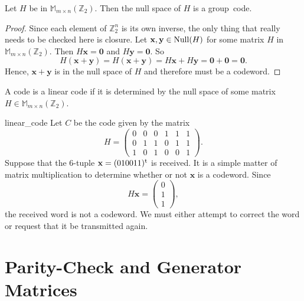  
\begin{theorem}
Let $H$ be in ${\mathbb M}_{m \times n}({\mathbb Z}_2)$. Then the null space of
$H$ is a group~code. 
\end{theorem}
 
 
\begin{proof}
Since each element of ${\mathbb Z}_2^n$ is its own inverse, the only
thing that really needs to be checked here is closure. Let ${\mathbf x},
{\mathbf y} \in {\rm Null}(H)$ for some matrix $H$ in ${\mathbb M}_{m \times
n}({\mathbb Z}_2)$. Then $H{\mathbf x} = {\mathbf 0}$ and $H{\mathbf y} =
{\mathbf 0}$. So 
\[
H({\mathbf x}+{\mathbf y}) = H({\mathbf x} +{\mathbf y})
=
H{\mathbf x} + H{\mathbf y} = {\mathbf 0}
+
{\mathbf 0}
= {\mathbf 0}.
\]
Hence, ${\mathbf x}+{\mathbf y}$ is in the null space of $H$ and
therefore must be a codeword. 
\hspace*{1in}
\end{proof}
 
 
\medskip
 
 
A code is a {\bfi linear code\/} if it is
determined by the null space of some matrix $H \in {\mathbb M}_{m \times
n}({\mathbb Z}_2)$.  
 
 
 
\begin{example}{linear_code}
Let $C$ be the code given by the matrix
\[
H =
\begin{pmatrix}
0 & 0 & 0 & 1 & 1 & 1 \\
0 & 1 & 1 & 0 & 1 & 1 \\
1 & 0 & 1 & 0 & 0 & 1
\end{pmatrix}.
\]
Suppose that the 6-tuple ${\mathbf x} = (010011)^{\rm t}$ is received.
It is a simple matter of matrix multiplication to determine whether or
not ${\mathbf x}$ is a codeword. Since 
\[
H{\mathbf x} =
\begin{pmatrix} 
0 \\ 1 \\ 1
\end{pmatrix},
\]
the received word is not a codeword.  We must either attempt to
correct the word or request that it be transmitted again.
\end{example}

 
 
 
\section{Parity-Check and Generator Matrices}
 
